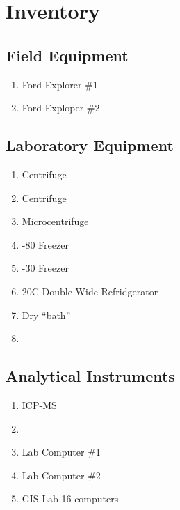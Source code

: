 \documentclass[12pt]{../SOP4_alpha}\usepackage[]{graphicx}\usepackage[]{color}
\begin{document}


\section{Inventory}

\subsection{Field Equipment}

\begin{enumerate}

\item Ford Explorer \#1
\item Ford Exploper \#2

\end{enumerate}


\subsection{Laboratory Equipment}

\begin{enumerate}
\item Centrifuge
\item Centrifuge
\item Microcentrifuge
\item -80 Freezer
\item -30 Freezer
\item 20\degree C Double Wide Refridgerator
\item Dry ``bath''
\item
\end{enumerate}

\subsection{Analytical Instruments}


\begin{enumerate}

\item ICP-MS

\item 

\item Lab Computer \#1
\item Lab Computer \#2

\item GIS Lab 16 computers
\end{enumerate}
\end{document}

